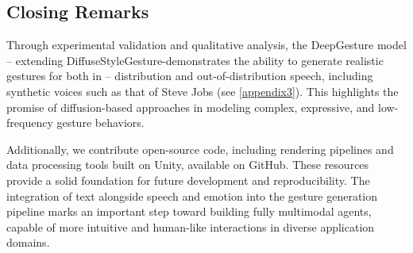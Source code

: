 \subsection{Closing Remarks}

Through experimental validation and qualitative analysis, the DeepGesture model -- extending DiffuseStyleGesture-demonstrates the ability to generate realistic gestures for both in -- distribution and out-of-distribution speech, including synthetic voices such as that of Steve Jobs (see \autoref{appendix3}). This highlights the promise of diffusion-based approaches in modeling complex, expressive, and low-frequency gesture behaviors.

Additionally, we contribute open-source code, including rendering pipelines and data processing tools built on Unity, available on GitHub. These resources provide a solid foundation for future development and reproducibility. The integration of text alongside speech and emotion into the gesture generation pipeline marks an important step toward building fully multimodal agents, capable of more intuitive and human-like interactions in diverse application domains.

\newpage
\newpage

%


